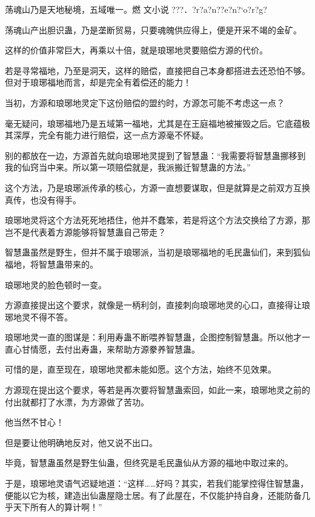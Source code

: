 
\begin{this_body}

荡魂山乃是天地秘境，五域唯一。燃 文小说   ???．?r?a?n??e?n?`o?r?g?

荡魂山产出胆识蛊，乃是垄断贸易，只要魂魄供应得上，便是开采不竭的金矿。

这样的价值非常巨大，再乘以十倍，就是琅琊地灵要赔偿方源的代价。

若是寻常福地，乃至是洞天，这样的赔偿，直接把自己本身都搭进去还恐怕不够。但对于琅琊福地而言，却是完全有着偿还的能力！

当初，方源和琅琊地灵定下这份赔偿的盟约时，方源怎可能不考虑这一点？

毫无疑问，琅琊福地乃是五域第一福地，尤其是在王庭福地被摧毁之后。它底蕴极其深厚，完全有能力进行赔偿，这一点方源毫不怀疑。

别的都放在一边，方源首先就向琅琊地灵提到了智慧蛊：“我需要将智慧蛊挪移到我的仙窍当中来。所以第一项赔偿就是，我派搬迁智慧蛊的方法。”

这个方法，乃是琅琊派传承的核心，方源一直想要谋取，但是就算是之前双方互换真传，也没有得手。

琅琊地灵将这个方法死死地捂住，他并不蠢笨，若是将这个方法交换给了方源，那岂不是代表着方源能够将智慧蛊自己带走？

智慧蛊虽然是野生，但并不属于琅琊派，当初是琅琊福地的毛民蛊仙们，来到狐仙福地，将智慧蛊带来的。

琅琊地灵的脸色顿时一变。

方源直接提出这个要求，就像是一柄利剑，直接刺向琅琊地灵的心口，直接得让琅琊地灵不得不答。

琅琊地灵一直的图谋是：利用寿蛊不断喂养智慧蛊，企图控制智慧蛊。所以他才一直心甘情愿，去付出寿蛊，来帮助方源豢养智慧蛊。

可惜的是，直至现在，琅琊地灵都未能如愿。这个方法，始终不见效果。

方源现在提出这个要求，等若是再次要将智慧蛊索回，如此一来，琅琊地灵之前的付出就都打了水漂，为方源做了苦功。

他当然不甘心！

但是要让他明确地反对，他又说不出口。

毕竟，智慧蛊虽然是野生仙蛊，但终究是毛民蛊仙从方源的福地中取过来的。

于是，琅琊地灵语气迟疑地道：“这样……好吗？其实，若我们能掌控得住智慧蛊，便能以它为核，建造出仙蛊屋隐士居。有了此屋在，不仅能护持自身，还能防备几乎天下所有人的算计啊！”


\end{this_body}
